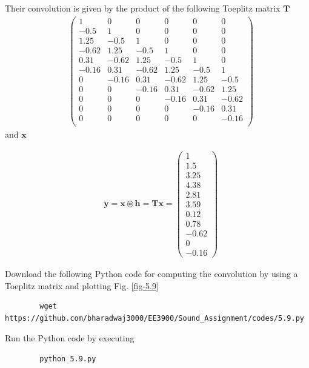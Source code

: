 \documentclass[journal,12pt,twocolumn]{IEEEtran}
\let\vec\mathbf
\numberwithin{equation}{section}
\renewcommand\thesection{\arabic{section}}
\newcommand{\myvec}[1]{\ensuremath{\begin{pmatrix}#1\end{pmatrix}}}
\begin{document}
\begin{enumerate}[label=\thesection.\arabic*]
	Their convolution is given by the product of the following Toeplitz matrix $\vec{T}$
	\begin{align}
		&\myvec{
			1 & 0 & 0 & 0 & 0 & 0 \\
			-0.5 & 1 & 0 & 0 & 0 & 0 \\
			1.25 & -0.5 & 1 & 0 & 0 & 0 \\
			-0.62 & 1.25 & -0.5 & 1 & 0 & 0 \\
			0.31 & -0.62 & 1.25 & -0.5 & 1 & 0 \\
			-0.16 & 0.31 & -0.62 & 1.25 & -0.5 & 1 \\
			0 & -0.16 & 0.31 & -0.62 & 1.25 & -0.5 \\
			0 & 0 & -0.16 & 0.31 & -0.62 & 1.25 \\
			0 & 0 & 0 & -0.16 & 0.31 & -0.62 \\
			0 & 0 & 0 & 0 & -0.16 & 0.31 \\
			0 & 0 & 0 & 0 & 0 & -0.16 \\
		} 
	\end{align}
	and $\vec{x}$
	
	\begin{align}
		&\vec{y} = \vec{x} \circledast \vec{h} = \vec{Tx} = \myvec{1 \\ 1.5 \\ 3.25 \\ 4.38 \\ 2.81 \\ 3.59 \\ 0.12 \\ 0.78 \\ -0.62 \\ 0 \\ -0.16}
	\end{align}
	
	Download the following Python code for computing the convolution by using a Toeplitz matrix and plotting Fig. \ref{fig-5.9}
	\begin{lstlisting}
		wget https://github.com/bharadwaj3000/EE3900/Sound_Assignment/codes/5.9.py
	\end{lstlisting}
	
	Run the Python code by executing
	\begin{lstlisting}
		python 5.9.py
	\end{lstlisting}


\end{enumerate}
\end{document}
